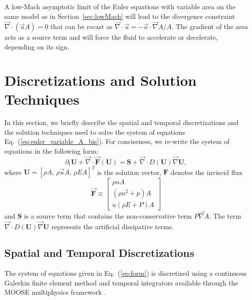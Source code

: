 \documentclass[review,10pt]{elsarticle}
\renewcommand{\div}{\vec{\nabla}\! \cdot \!}
\newcommand{\grad}{\vec{\nabla}}
\newcommand{\eqt}[1]{Eq.~(\ref{#1})}                     %
\newcommand{\sct}[1]{Section~\ref{#1}}                   %
\begin{document}
A low-Mach asymptotic limit of the Euler equations with variable area on the same model as in 
\sct{sec:lowMach} will lead to the divergence constraint $\div (\vec{u} A) = 0$ that can be recast 
as $\div \vec{u} = -\vec{u} \cdot \grad{A} / A$. The gradient of the area acts as a source term and 
will force the fluid to accelerate or decelerate, depending on its sign. 

\section{Discretizations and Solution Techniques} \label{sec:solution_tech}

In this section, we briefly describe the spatial and temporal discretizations and the solution techniques 
used to solve the system of equations \eqt{eq:euler_variable_A_bis}. For conciseness, we re-write the system of 
equations in the following form:
\begin{equation}
\label{eq:form}
\partial_t \mathbf{U} + \div \vec{\mathbf{F}}\left( \mathbf{U} \right) = \mathbf{S} + \div D(\mathbf{U}) \grad \mathbf{U} ,
\end{equation}
where $\mathbf{U}=[\rho A,\, \rho \vec{u} A,\, \rho E A]^T$ is the solution vector, $\mathbf{F}$ denotes the inviscid flux 
\begin{equation}
  \vec{\mathbf{F}} \equiv
  \begin{bmatrix}
    \rho u A                     \\
    \left(\rho u^2 + p\right) A  \\
    u (\rho E +P) A
  \end{bmatrix}
\end{equation}
and $\mathbf{S}$ is a source term that contains the non-conservative term $P\grad A$. The term 
$\div D(\mathbf{U}) \grad \mathbf{U}$ represents the artificial dissipative terms. 

\subsection{Spatial and Temporal Discretizations} \label{sec:disc}
The system of equations given in \eqt{eq:form} is discretized using a continuous Galerkin finite element 
method and temporal integrators available through the MOOSE multiphysics framework \cite{MOOSE}.
\end{document}
